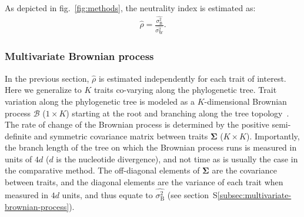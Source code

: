 \documentclass{article}
\newcommand{\UniDimArray}[1]{\bm{#1}}
\newcommand{\BiDimArray}[1]{\bm{#1}}
\newcommand{\RateBetween}{\sigma^2_{\mathrm{B}}}
\newcommand{\RateWhithin}{\sigma^2_{\mathrm{W}}}
\newcommand{\EstRateBetween}{\widehat{\RateBetween}}
\newcommand{\EstRateWhithin}{\widehat{\RateWhithin}}
\newcommand{\EstNI}{\widehat{\rho}}
\newcommand{\Ntrait}{K}
\newcommand{\Covariancematrix}{\Sigma}
\newcommand{\CovarianceMatrix}{\BiDimArray{\Covariancematrix}}
\newcommand{\brownian}{\mathcal{B}}
\newcommand{\Brownian}{\UniDimArray{\brownian}}
\begin{document}
As depicted in fig.~\ref{fig:methods}, the neutrality index is estimated as:
\begin{gather}
    \EstNI = \frac{\EstRateBetween}{\EstRateWhithin}. \label{eq:estimated-NI}
\end{gather}

\subsubsection{Multivariate Brownian process}

In the previous section, $\EstNI$ is estimated independently for each trait of interest.
Here we generalize to $\Ntrait$ traits co-varying along the phylogenetic tree.
Trait variation along the phylogenetic tree is modeled as a $\Ntrait$-dimensional Brownian process $\Brownian$ ($1 \times \Ntrait$) starting at the root and branching along the tree topology~\parencite{huelsenbeck_detecting_2003, lartillot_phylogenetic_2011, lartillot_joint_2012, latrille_inferring_2021}.
The rate of change of the Brownian process is determined by the positive semi-definite and symmetric covariance matrix between traits $\CovarianceMatrix$ ($\Ntrait \times \Ntrait$).
Importantly, the branch length of the tree on which the Brownian process runs is measured in units of $4d$ ($d$ is the nucleotide divergence), and not time as is usually the case in the comparative method. The off-diagonal elements of $\CovarianceMatrix$ are the covariance between traits, and the diagonal elements are the variance of each trait when measured in $4d$ units, and thus equate to $\EstRateBetween$ (see section~S\ref{subsec:multivariate-brownian-process}).
\end{document}
